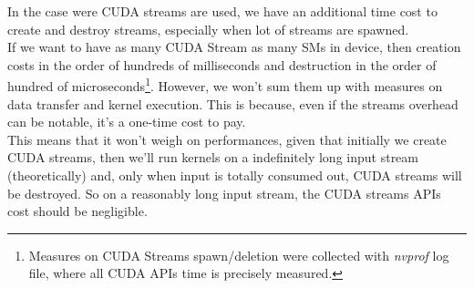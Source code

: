 In the case were CUDA streams are used, we have an additional time cost to create and destroy streams, especially when lot of streams are spawned.\\
If we want to have as many CUDA Stream as many SMs in device, then creation costs in the order of hundreds of milliseconds and destruction in the order of hundred of microseconds\footnote{Measures on CUDA Streams spawn/deletion were collected with \textit{nvprof} log file, where all CUDA APIs time is precisely measured.}. However, we won't sum them up with measures on data transfer and kernel execution. This is because, even if the streams overhead can be notable, it's a one-time cost to pay.\\
This means that it won't weigh on performances, given that initially we create CUDA streams, then we'll run kernels on a indefinitely long input stream (theoretically) and, only when input is totally consumed out, CUDA streams will be destroyed. 
So on a reasonably long input stream, the CUDA streams APIs cost should be negligible.\\

